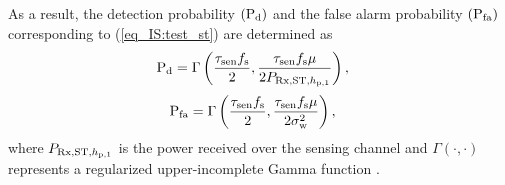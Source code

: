 As a result, the detection probability $(\text{P}_{\text{d}})$ and the false alarm probability $(\text{P}_{\text{fa}})$ corresponding to (\ref{eq_IS:test_st}) are determined as \cite{Tan08}
\begin{align}
\text{P}_{\text{d}} &= \Gamma\left( \frac{\tau_{\text{sen}} f_{\text{s}}}{2}, \frac{\tau_{\text{sen}} f_{\text{s}} \mu}{2 P_{\text{Rx,ST,$h_{\text{p,1}}$}}} \right),  \label{eq_IS:pd} 
\end{align}
\begin{align}
\text{P}_{\text{fa}} &= \Gamma\left( \frac{\tau_{\text{sen}} f_{\text{s}}}{2}, \frac{\tau_{\text{sen}} f_{\text{s}} \mu}{2 \sigma^2_{\text{w}}} \right),  \label{eq_IS:pfa} 
\end{align}
where $P_{\text{Rx,ST,$h_{\text{p,1}}$}}$ is the power received over the sensing channel and $\Gamma(\cdot, \cdot)$ represents a regularized upper-incomplete Gamma function \cite{grad}.%


